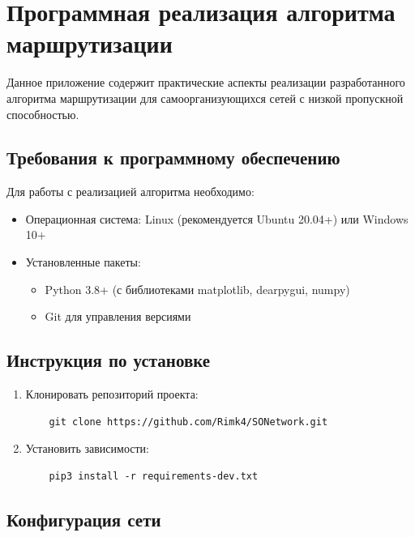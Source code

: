 \chapter{Программная реализация алгоритма маршрутизации}\label{appendix-implementation}

Данное приложение содержит практические аспекты реализации разработанного алгоритма маршрутизации для самоорганизующихся сетей с низкой пропускной способностью.

\section{Требования к программному обеспечению}

Для работы с реализацией алгоритма необходимо:

\begin{itemize}
    \item Операционная система: Linux (рекомендуется Ubuntu 20.04+) или Windows 10+
    \item Установленные пакеты:
    \begin{itemize}
        \item Python 3.8+ (с библиотеками matplotlib, dearpygui, numpy)
        \item Git для управления версиями
    \end{itemize}
\end{itemize}

\section{Инструкция по установке}

\begin{enumerate}
    \item Клонировать репозиторий проекта:
    \begin{verbatim}
    git clone https://github.com/Rimk4/SONetwork.git
    \end{verbatim}
    
    \item Установить зависимости:
    \begin{verbatim}
    pip3 install -r requirements-dev.txt
    \end{verbatim}
\end{enumerate}

\section{Конфигурация сети}

